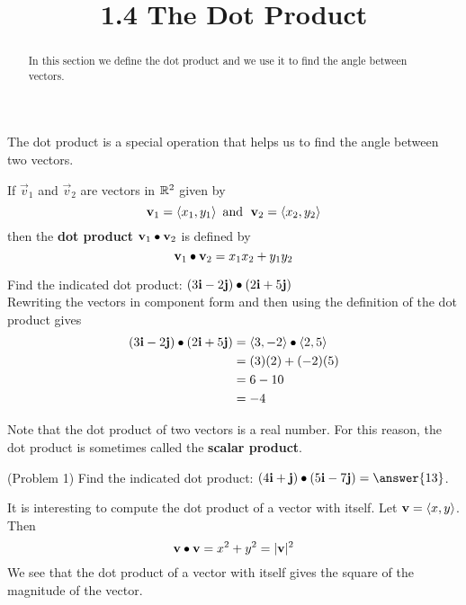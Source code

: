 \documentclass[handout]{ximera}
\title{1.4 The Dot Product}
\begin{document}
\begin{abstract}
In this section we define the dot product and we use it to find the angle between vectors.
\end{abstract}
 
\maketitle
The dot product is a special operation that helps us to find the angle between two vectors.
\begin{definition}
If $\vec{v}_1$ and $\vec{v}_2$ are vectors in $\mathbb R^2$ given by
\[
\mathbf{v}_1 = \left\langle x_1, y_1\right\rangle \text{  and   } \;\mathbf{v}_2 = \left\langle x_2, y_2\right\rangle
\]
then the \textbf{dot product} $\mathbf{v}_1 \bullet \mathbf{v}_2$ is defined by
\[
\mathbf{v}_1 \bullet \mathbf{v}_2 = x_1x_2 + y_1y_2
\]
\end{definition}

\begin{example}[Example 1]
Find the indicated dot product: $\left(3\mathbf{i} -2\mathbf{j}\right) \bullet \left(2\mathbf{i} +5\mathbf{j}\right)$\\
Rewriting the vectors in component form and then using the definition of the dot product gives
\begin{align*}
\left(3\mathbf{i} -2\mathbf{j}\right) \bullet \left(2\mathbf{i} +5\mathbf{j}\right) &= \left\langle 3, -2\right\rangle \bullet \left\langle 2, 5\right\rangle\\
                                                                      &= (3)(2)+(-2)(5)\\
                                                                      & = 6-10\\
                                                                      &= -4
\end{align*}
\end{example}

Note that the dot product of two vectors is a real number.  For this reason, the dot product is sometimes called the \textbf{scalar product}.

\begin{problem}(Problem 1)
Find the indicated dot product: $\left(4\vec{i} + \vec{j}\right) \dotp \left(5\vec{i} -7\vec{j}\right) =\answer{13}$.\\
\end{problem}

It is interesting to compute the dot product of a vector with itself.  Let $\mathbf{v} = \left\langle x, y\right\rangle$. Then
\[
\mathbf{v} \bullet \mathbf{v} = x^2 + y^2 = |\mathbf{v}|^2
\]
We see that the dot product of a vector with itself gives the square of the magnitude of the vector.
\end{document}
